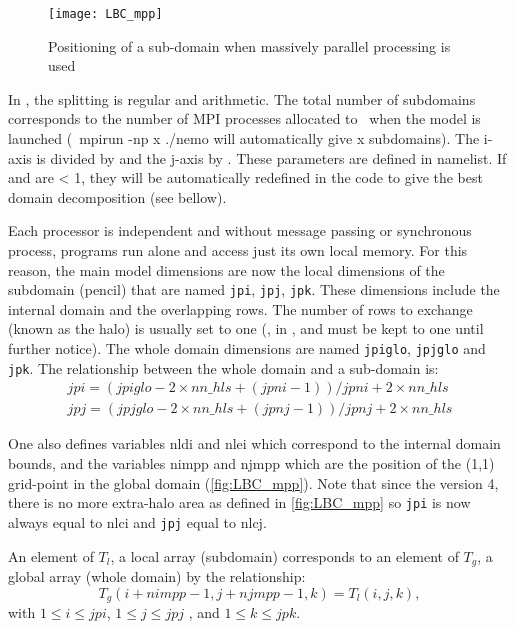 \documentclass[../main/NEMO_manual]{subfiles}
\begin{document}
\begin{figure}[!t]
  \centering
  \texttt{[image: LBC\_mpp]}
  \caption{Positioning of a sub-domain when massively parallel processing is used}
  \label{fig:LBC_mpp}
\end{figure}

In \NEMO, the splitting is regular and arithmetic.
The total number of subdomains corresponds to the number of MPI processes allocated to \NEMO\ when the model is launched
(\ie\ mpirun -np x ./nemo will automatically give x subdomains).
The i-axis is divided by  and the j-axis by .
These parameters are defined in  namelist.
If  and  are < 1, they will be automatically redefined in the code to give the best domain decomposition
(see bellow).

Each processor is independent and without message passing or synchronous process, programs run alone and access just its own local memory.
For this reason,
the main model dimensions are now the local dimensions of the subdomain (pencil) that are named \texttt{jpi}, \texttt{jpj}, \texttt{jpk}.
These dimensions include the internal domain and the overlapping rows.
The number of rows to exchange (known as the halo) is usually set to one (, in ,
and must be kept to one until further notice).
The whole domain dimensions are named \texttt{jpiglo}, \texttt{jpjglo} and \texttt{jpk}.
The relationship between the whole domain and a sub-domain is:
\begin{gather*}
  jpi = ( jpiglo-2\times nn\_hls + (jpni-1) ) / jpni + 2\times nn\_hls \\
  jpj = ( jpjglo-2\times nn\_hls + (jpnj-1) ) / jpnj + 2\times nn\_hls
\end{gather*}

One also defines variables nldi and nlei which correspond to the internal domain bounds, and the variables nimpp and njmpp which are the position of the (1,1) grid-point in the global domain (\autoref{fig:LBC_mpp}). Note that since the version 4, there is no more extra-halo area as defined in \autoref{fig:LBC_mpp} so \texttt{jpi} is now always equal to nlci and \texttt{jpj} equal to nlcj.

An element of $T_{l}$, a local array (subdomain) corresponds to an element of $T_{g}$,
a global array (whole domain) by the relationship:
\[
  T_{g} (i+nimpp-1,j+njmpp-1,k) = T_{l} (i,j,k),
\]
with $1 \leq i \leq jpi$, $1  \leq j \leq jpj $ , and  $1  \leq k \leq jpk$.
\end{document}
